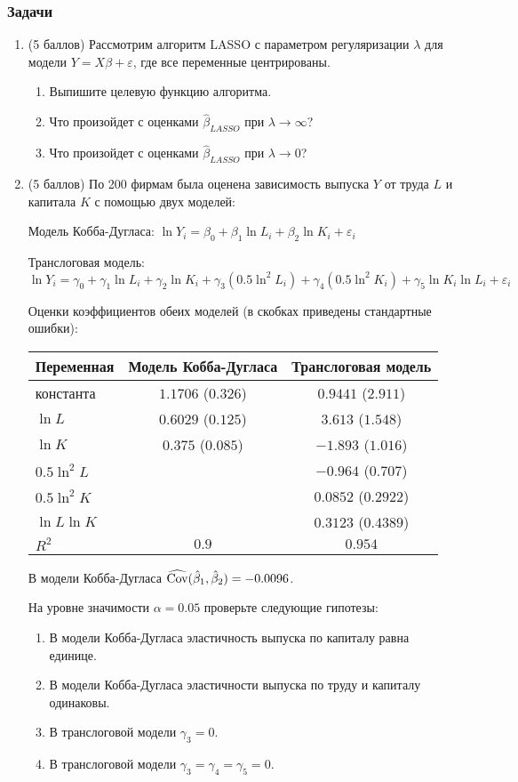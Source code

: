 \subsubsection*{Задачи}
\begin{enumerate}
\item
(5 баллов)
Рассмотрим алгоритм LASSO с параметром регуляризации $\lambda$
для модели $Y=X\beta + \varepsilon$, где все переменные центрированы.
\begin{enumerate}
    \item Выпишите целевую функцию алгоритма.
    \item Что произойдет с оценками $\hat\beta_{LASSO}$ при $\lambda \to \infty$?
    \item Что произойдет с оценками $\hat\beta_{LASSO}$ при $\lambda \to 0$?
\end{enumerate}
\item
(5 баллов)
По 200 фирмам была оценена зависимость выпуска $Y$ от труда $L$ и капитала $K$
с помощью двух моделей:

Модель Кобба-Дугласа: $\ln{Y_i} = \beta_0 + \beta_1 \ln{L_i} + \beta_2 \ln{K_i} +
\varepsilon_i$

Транслоговая модель: $\ln{Y_i} = \gamma_0 + \gamma_1 \ln{L_i} + \gamma_2 \ln{K_i} +
\gamma_3 (0.5 \ln^2{L_i}) + \gamma_4 (0.5 \ln^2{K_i}) + \gamma_5 \ln{K_i} \ln{L_i} +
\varepsilon_i$

Оценки коэффициентов обеих моделей (в скобках приведены стандартные ошибки):

\begin{tabular}{lcc}
\toprule
Переменная & Модель Кобба-Дугласа & Транслоговая модель \\
\midrule
константа & $1.1706$ ($0.326$) & $0.9441$ ($2.911$)   \\
$\ln L$ & $0.6029$ ($0.125$) & $3.613$ ($1.548$)  \\
$\ln K$ & $0.375$ ($0.085$) & $-1.893$ ($1.016$)  \\
$0.5 \ln^2 L$ &  & $-0.964$ ($0.707$)  \\
$0.5 \ln^2 K$ & & $0.0852$ ($0.2922$) \\
$\ln L \ln K$ & & $0.3123$ ($0.4389$)  \\
$R^2$ & $0.9$ & $0.954$  \\
\bottomrule
\end{tabular}

В модели Кобба-Дугласа $\operatorname{\widehat{\operatorname{Cov}}}(\hat{\beta}_1, \hat{\beta}_2)= -0.0096$.

На уровне значимости $\alpha = 0.05$ проверьте следующие гипотезы:
\begin{enumerate}
\item В модели Кобба-Дугласа эластичность выпуска по капиталу равна единице.
\item В модели Кобба-Дугласа эластичности выпуска по труду и капиталу одинаковы.
\item В транслоговой модели $\gamma_3 = 0$.
\item В транслоговой модели $\gamma_3 = \gamma_4 = \gamma_5 = 0$.
\end{enumerate}


\end{enumerate}
